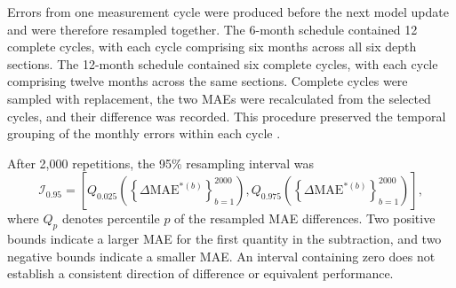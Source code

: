 Errors from one measurement cycle were produced before the next model update and were therefore resampled together. The 6-month schedule contained 12 complete cycles, with each cycle comprising six months across all six depth sections. The 12-month schedule contained six complete cycles, with each cycle comprising twelve months across the same sections. Complete cycles were sampled with replacement, the two MAEs were recalculated from the selected cycles, and their difference was recorded. This procedure preserved the temporal grouping of the monthly errors within each cycle \citep{lahiri_2003_bootstrap}.

After 2,000 repetitions, the 95\% resampling interval was
\begin{equation}
\mathcal{I}_{0.95}
=
\left[
Q_{0.025}
\left(
\left\{\Delta \mathrm{MAE}^{*(b)}\right\}_{b=1}^{2000}
\right),
Q_{0.975}
\left(
\left\{\Delta \mathrm{MAE}^{*(b)}\right\}_{b=1}^{2000}
\right)
\right],
\label{eq:mae_resampling_interval}
\end{equation}
where $Q_p$ denotes percentile $p$ of the resampled MAE differences. Two positive bounds indicate a larger MAE for the first quantity in the subtraction, and two negative bounds indicate a smaller MAE. An interval containing zero does not establish a consistent direction of difference or equivalent performance.

\FloatBarrier
